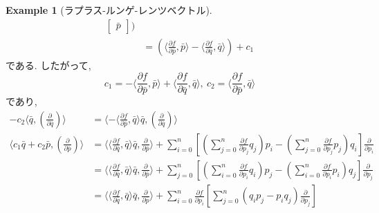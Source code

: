 \documentclass[a4paper]{ujarticle}
\numberwithin{equation}{section}
\theoremstyle{definition}
\newtheorem{example}{Example}
\begin{document}
\begin{example}[ラプラス-ルンゲ-レンツベクトル]
\begin{align}
\begin{bmatrix}
                        \bar{p}
                    \end{bmatrix}
                    )\\
                &= \left(\langle \frac{\partial f}{\partial \bar{p}}, \bar{p}\rangle - \langle \frac{\partial f}{\partial \bar{q}}, \bar{q}\rangle\right) + c_1
            \end{align}
            である. したがって, 
            \[
                c_1 = - \langle \frac{\partial f}{\partial \bar{p}}, \bar{p}\rangle + \langle \frac{\partial f}{\partial \bar{q}}, \bar{q}\rangle, \ c_2 = \langle\frac{\partial f}{\partial \bar{p}}, \bar{q} \rangle
            \]
            であり, 
            \begin{align}
                - c_2 \langle \bar{q}, \left(\frac{\partial}{\partial \bar{q}}\right)\rangle 
                &= \langle - \langle\frac{\partial f}{\partial \bar{p}}, \bar{q} \rangle \bar{q}, \left(\frac{\partial}{\partial \bar{q}}\right)\rangle\\
                \langle c_1 \bar{q} + c_2 \bar{p}, \left(\frac{\partial}{\partial \bar{p}}\right)\rangle 
                &= \langle \langle \frac{\partial f}{\partial \bar{q}}, \bar{q} \rangle \bar{q},  \frac{\partial}{\partial \bar{p}} \rangle
                + \sum_{i = 0}^{n} \left[\left(\sum_{j = 0}^{n} \frac{\partial f}{\partial p_j} q_j\right)p_i - \left(\sum_{j = 0}^{n} \frac{\partial f}{\partial p_j} p_j\right)q_i \right]\frac{\partial}{\partial p_i} \\
                &= \langle \langle \frac{\partial f}{\partial \bar{q}}, \bar{q} \rangle \bar{q},  \frac{\partial}{\partial \bar{p}} \rangle
                + \sum_{j = 0}^{n} \left[\left(\sum_{i = 0}^{n} \frac{\partial f}{\partial p_i} q_i\right)p_j - \left(\sum_{i = 0}^{n} \frac{\partial f}{\partial p_i} p_i\right)q_j \right]\frac{\partial}{\partial p_j} \\
                &= \langle \langle \frac{\partial f}{\partial \bar{q}}, \bar{q} \rangle \bar{q},  \frac{\partial}{\partial \bar{p}} \rangle
                + \sum_{i = 0}^{n} \frac{\partial f}{\partial p_i} \left[ \sum_{j = 0}^{n}(q_i p_j - p_i q_j) \frac{\partial}{\partial p_j}\right]
            \end{align}



\end{example}
\end{document}
